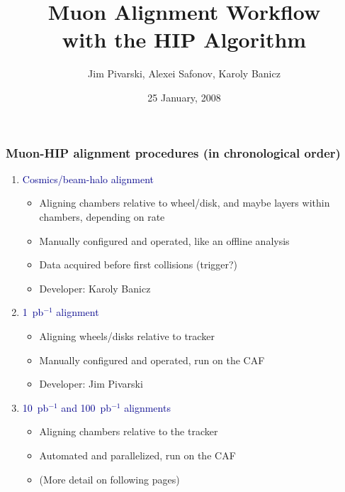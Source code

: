 \documentclass[compress]{beamer}
\title{Muon Alignment Workflow \\ with the HIP Algorithm}
\author{Jim Pivarski, Alexei Safonov, Karoly Banicz}
\institute{Texas A\&M University}
\date{25 January, 2008}
\begin{document}
\frame{\titlepage}


\begin{frame}
\frametitle{Muon-HIP alignment procedures (in chronological order)}
\begin{enumerate}\setlength{\itemsep}{0.35 cm}
\item \textcolor{darkblue}{Cosmics/beam-halo alignment}
\begin{itemize}
\item Aligning chambers relative to wheel/disk, and maybe layers within chambers, depending on rate
\item Manually configured and operated, like an offline analysis
\item Data acquired before first collisions (trigger?)
\item Developer: Karoly Banicz
\end{itemize}

\item \textcolor{darkblue}{1~pb$^{-1}$ alignment}
\begin{itemize}
\item Aligning wheels/disks relative to tracker
\item Manually configured and operated, run on the CAF
\item Developer: Jim Pivarski
\end{itemize}

\item \textcolor{darkblue}{10~pb$^{-1}$ and 100~pb$^{-1}$ alignments}
\begin{itemize}
\item Aligning chambers relative to the tracker
\item Automated and parallelized, run on the CAF
\item (More detail on following pages)
\end{itemize}
\end{enumerate}
\end{frame}
\end{document}
